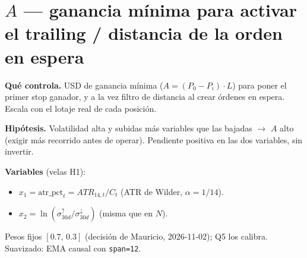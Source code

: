\documentclass[11pt,a4paper]{article}
\newcommand{\code}[1]{\texttt{\small #1}}
\begin{document}
\section*{$A$ --- ganancia mínima para activar el trailing / distancia de la orden en espera}

\textbf{Qué controla.} USD de ganancia mínima ($A=(P_0-P_i)\cdot L$) para poner el primer stop ganador, y a la vez filtro de distancia al crear órdenes en espera. Escala con el lotaje real de cada posición.

\textbf{Hipótesis.} Volatilidad alta y subidas más variables que las bajadas $\rightarrow$ $A$ alto (exigir más recorrido antes de operar). Pendiente positiva en las dos variables, sin invertir.

\textbf{Variables} (velas H1):
\begin{itemize}\setlength{\itemsep}{1pt}\setlength{\topsep}{1pt}
\item $x_1=\text{atr\_pct}_t=ATR_{14,t}/C_t$ (ATR de Wilder, $\alpha=1/14$).
\item $x_2=\ln(\sigma^{\uparrow}_{30d}/\sigma^{\downarrow}_{30d})$ (misma que en $N$).
\end{itemize}
Pesos fijos $[0.7,\,0.3]$ (decisión de Mauricio, 2026-11-02); Q5 los calibra. Suavizado: EMA causal con \code{span=12}.
\end{document}
